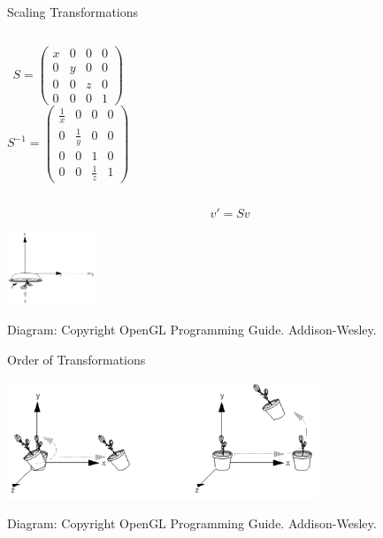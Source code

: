 \documentclass[aspectratio=1610,xcolor=dvipsnames,t]{beamer}
\newcommand{\showcode}[1]{\begin{mdframed}[style=code] %
                          \end{mdframed}%
}
\begin{document}
\begin{frame}{Scaling Transformations} 
    \showcode{scale.c} 
    \begin{columns}[t]
            \begin{equation*}
                S = \left(
                        \begin{array}{cccc}
                            x   & 0     & 0     & 0 \\
                            0   & y     & 0     & 0 \\
                            0   & 0     & z     & 0 \\
                            0   & 0     & 0     & 1
                        \end{array} 
                    \right)
            \end{equation*} 
            \begin{equation*}
               S^{-1} = \left(
                        \begin{array}{cccc}
                            \frac{1}{x} & 0             & 0             & 0 \\
                            0           & \frac{1}{y}   & 0             & 0 \\
                            0           & 0             & 1             & 0 \\
                            0           & 0             & \frac{1}{z}   & 1
                        \end{array} 
                    \right)
            \end{equation*} 
    \end{columns} 
    \begin{equation*}
        v' = S v
    \end{equation*} 
    \begin{center} 
        \includegraphics[width=0.2\textwidth]{scaling} 
    \end{center} 
    \tiny
    Diagram: Copyright OpenGL Programming Guide. Addison-Wesley. 
    \normalsize
\end{frame} 

\begin{frame}{Order of Transformations}
   \begin{center} 
       \includegraphics[width=0.7\textwidth]{order} 
    \end{center} 
    \tiny
    Diagram: Copyright OpenGL Programming Guide. Addison-Wesley. 
    \normalsize
\end{frame} 
\end{document}
